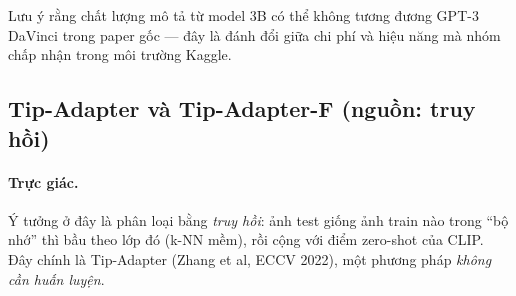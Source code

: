 Lưu ý rằng chất lượng mô tả từ model 3B có thể không tương đương GPT-3 DaVinci trong paper gốc ---
đây là đánh đổi giữa chi phí và hiệu năng mà nhóm chấp nhận trong môi trường Kaggle.

\subsection{Tip-Adapter và Tip-Adapter-F (nguồn: truy hồi)}

\paragraph{Trực giác.} Ý tưởng ở đây là phân loại bằng \emph{truy hồi}: ảnh test giống ảnh train nào
trong ``bộ nhớ'' thì bầu theo lớp đó (k-NN mềm), rồi cộng với điểm zero-shot của CLIP. Đây chính là
Tip-Adapter \cite{zhang2022tip} (Zhang et al, ECCV 2022), một phương pháp \emph{không cần huấn luyện}.



